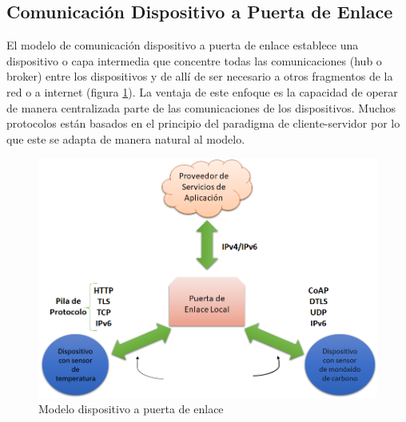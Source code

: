 \subsection{Comunicación Dispositivo a Puerta de Enlace}
El modelo de comunicación dispositivo a puerta de enlace establece una dispositivo o capa intermedia que concentre todas las comunicaciones (hub o broker) entre los dispositivos y de allí de ser necesario a otros fragmentos de la red o a internet (figura \ref{fig:d2g}). La ventaja de este enfoque es la capacidad de operar de manera centralizada parte de las comunicaciones de los dispositivos. Muchos protocolos están basados en el principio del paradigma de cliente-servidor por lo que este se adapta de manera natural al modelo.
\begin{figure}[htb]
\centering
\includegraphics[scale=0.38]{./Figuras/d2g.png}
\caption{Modelo dispositivo a puerta de enlace}
\label{fig:d2g}
\vspace*{-10pt}
\end{figure}

